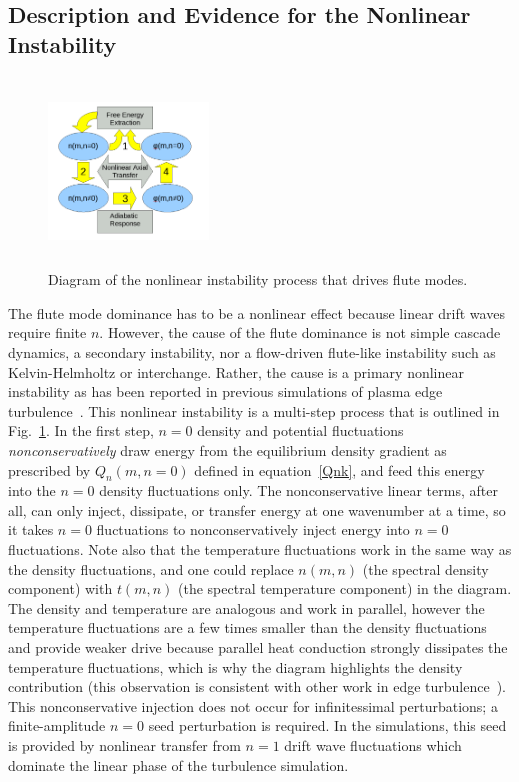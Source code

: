 \documentclass[showpacs,preprintnumbers,amsmath,amssymb,superscriptaddress]{revtex4}
\begin{document}
\subsection{Description and Evidence for the Nonlinear Instability}

\begin{figure}
\includegraphics[width=0.38\textwidth,height=50mm]{nl_instability_diagram}
\hfil
\caption{Diagram of the nonlinear instability process that drives flute modes.}
\label{nl_instability_diagram}
\end{figure}

The flute mode dominance has to be a nonlinear effect because linear drift waves require finite $n$. However, the cause of the flute dominance is not simple cascade dynamics, a secondary 
instability, nor a flow-driven flute-like instability such as
Kelvin-Helmholtz or interchange. Rather, the cause is a primary
nonlinear instability as has been reported in previous simulations of
plasma edge turbulence~\cite{biskamp1995,drake1995}. 
This nonlinear instability is a multi-step process that is outlined in Fig.~\ref{nl_instability_diagram}.
In the first step, $n=0$ density and potential fluctuations \emph{nonconservatively} draw energy from the equilibrium density gradient as prescribed 
by $Q_n(m,n=0)$ defined in equation~\ref{Qnk}, and feed
this energy into the $n=0$ density fluctuations only. The nonconservative linear terms, after all, can only inject, dissipate, or transfer energy at one wavenumber at a time, so it takes
$n=0$ fluctuations to nonconservatively inject energy into $n=0$
fluctuations. Note also that the temperature fluctuations work in the same way as the density fluctuations, and one could replace $n(m,n)$ (the spectral density component)
with $t(m,n)$ (the spectral temperature component) in the diagram. The density and temperature are analogous and work in parallel, however the temperature fluctuations are a few times smaller
than the density fluctuations and provide weaker drive because
parallel heat conduction strongly dissipates the temperature
fluctuations, which is why the diagram highlights the density
contribution (this observation is consistent with other work in edge turbulence~\cite{zeiler1997}).
 This nonconservative injection does not occur for
infinitessimal perturbations; a finite-amplitude $n=0$ seed
perturbation is required.  In the simulations, this seed is provided
by nonlinear transfer from $n=1$ drift wave fluctuations which
dominate the linear phase of the turbulence simulation.
\end{document}
